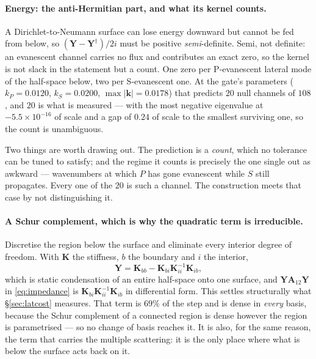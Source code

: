 \documentclass[11pt,a4paper]{article}
\newcommand{\bA}{\mathbf{A}}
\newcommand{\bY}{\mathbf{Y}}
\begin{document}
\paragraph{Energy: the anti-Hermitian part, and what its kernel counts.}  A
Dirichlet-to-Neumann surface can lose energy downward but cannot be fed from
below, so $(\bY-\bY^{\dagger})/2i$ must be positive \emph{semi}-definite.  Semi,
not definite: an evanescent channel carries no flux and contributes an exact
zero, so the kernel is not slack in the statement but a count.  One zero per
P-evanescent lateral mode of the half-space below, two per S-evanescent one.  At
the gate's parameters ($k_P=0.0120$, $k_S=0.0200$, $\max|\mathbf{k}|=0.0178$)
that predicts $20$ null channels of $108$, and $20$ is what is measured --- with
the most negative eigenvalue at $-5.5\times10^{-16}$ of scale and a gap of
$0.24$ of scale to the smallest surviving one, so the count is unambiguous.

Two things are worth drawing out.  The prediction is a \emph{count}, which no
tolerance can be tuned to satisfy; and the regime it counts is precisely the one
\cite{haines2004} single out as awkward --- wavenumbers at which $P$ has gone
evanescent while $S$ still propagates.  Every one of the $20$ is such a channel.
The construction meets that case by not distinguishing it.

\paragraph{A Schur complement, which is why the quadratic term is irreducible.}
Discretise the region below the surface and eliminate every interior degree of
freedom.  With $\mathbf{K}$ the stiffness, $b$ the boundary and $i$ the interior,
\begin{equation}\label{eq:schur}
  \bY = \mathbf{K}_{bb} - \mathbf{K}_{bi}\mathbf{K}_{ii}^{-1}\mathbf{K}_{ib},
\end{equation}
which is static condensation of an entire half-space onto one surface, and
$\bY\bA_{12}\bY$ in \eqref{eq:impedance} is
$\mathbf{K}_{bi}\mathbf{K}_{ii}^{-1}\mathbf{K}_{ib}$ in differential form.  This
settles structurally what \S\ref{sec:latcost} measures.  That term is $69\%$ of
the step and is dense in \emph{every} basis, because the Schur complement of a
connected region is dense however the region is parametrised --- so no change of
basis reaches it.  It is also, for the same reason, the term that carries the
multiple scattering: it is the only place where what is below the surface acts
back on it.
\end{document}
